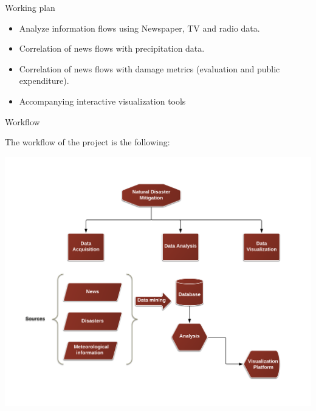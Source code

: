 \documentclass[ignorenonframetext,]{beamer}
\begin{document}
\begin{frame}{Working plan}

\begin{itemize}
\itemsep1pt\parskip0pt
\item
  Analyze information flows using Newspaper, TV and radio data.
\item
  Correlation of news flows with precipitation data.
\item
  Correlation of news flows with damage metrics (evaluation and public
  expenditure).
\item
  Accompanying interactive visualization tools
\end{itemize}

\end{frame}

\begin{frame}{Workflow}

The workflow of the project is the following:

\includegraphics{img/workflow_vf.png}

\end{frame}
\end{document}
